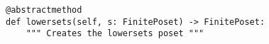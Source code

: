 \par\begin{minipage}{60ex}
\begin{verbatim}
@abstractmethod
def lowersets(self, s: FinitePoset) -> FinitePoset:
    """ Creates the lowersets poset """
\end{verbatim}
\end{minipage}\par